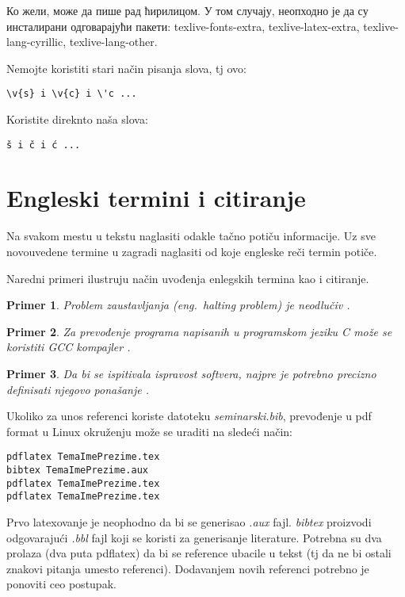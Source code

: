\documentclass[a4paper]{article}
\newtheorem{primer}{Primer}[section]
\begin{document}
{Ко жели, може да пише рад ћирилицом. У том случају, неопходно је да су инсталирани одговарајући пакети: texlive-fonts-extra, texlive-latex-extra, texlive-lang-cyrillic, texlive-lang-other. 

Nemojte koristiti stari način pisanja slova, tj ovo:
\begin{verbatim}
\v{s} i \v{c} i \'c ...
\end{verbatim}
Koristite direknto naša slova:	
\begin{verbatim}
š i č i ć ... 
\end{verbatim}


\section{Engleski termini i citiranje}	
\label{sec:termini_i_citiranje}

Na svakom mestu u tekstu naglasiti odakle tačno potiču informacije. Uz sve novouvedene termine u zagradi naglasiti od koje engleske reči termin potiče. 

Naredni primeri ilustruju način uvođenja enlegskih termina kao i citiranje.

\begin{primer}
Problem zaustavljanja (eng.~{\em halting problem}) je neodlučiv \cite{haltingproblem}.
\end{primer}

\begin{primer}
Za prevođenje programa napisanih u programskom jeziku C može se koristiti GCC kompajler \cite{gcc}.
\end{primer}

\begin{primer}
 Da bi se ispitivala ispravost softvera, najpre je potrebno precizno definisati njegovo ponašanje \cite{laski2009software}. 
\end{primer}

Ukoliko za unos referenci koriste datoteku {\em seminarski.bib},  prevođenje u pdf format u Linux okruženju može se uraditi na sledeći način:
\begin{verbatim}
pdflatex TemaImePrezime.tex 
bibtex TemaImePrezime.aux 
pdflatex TemaImePrezime.tex 
pdflatex TemaImePrezime.tex 
\end{verbatim}
Prvo latexovanje je neophodno da bi se generisao {\em .aux} fajl. {\em bibtex} proizvodi odgovarajući {\em .bbl} fajl koji se koristi za generisanje literature. 
Potrebna su dva prolaza (dva puta pdflatex) da bi se reference ubacile u tekst (tj da ne bi ostali znakovi pitanja umesto referenci). Dodavanjem novih referenci potrebno je ponoviti ceo postupak.  


}
\end{document}

